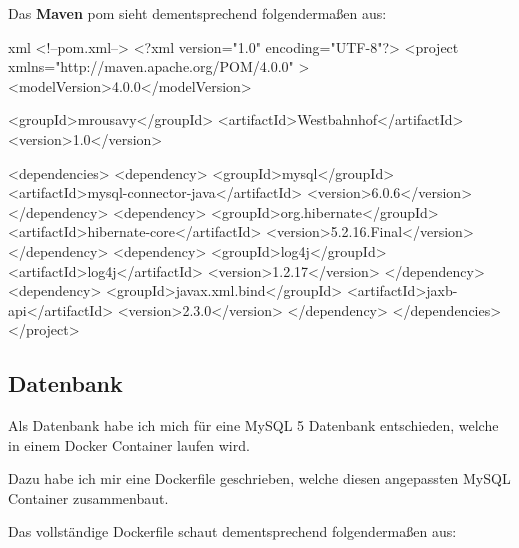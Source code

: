 Das \textbf{Maven} \gls{pom} sieht dementsprechend folgendermaßen aus:

\begin{code}{xml}
<!--pom.xml-->
<?xml version="1.0" encoding="UTF-8"?>
<project xmlns="http://maven.apache.org/POM/4.0.0" >
    <modelVersion>4.0.0</modelVersion>

    <groupId>mrousavy</groupId>
    <artifactId>Westbahnhof</artifactId>
    <version>1.0</version>

    <dependencies>
        <dependency>
            <groupId>mysql</groupId>
            <artifactId>mysql-connector-java</artifactId>
            <version>6.0.6</version>
        </dependency>
        <dependency>
            <groupId>org.hibernate</groupId>
            <artifactId>hibernate-core</artifactId>
            <version>5.2.16.Final</version>
        </dependency>
        <dependency>
            <groupId>log4j</groupId>
            <artifactId>log4j</artifactId>
            <version>1.2.17</version>
        </dependency>
        <dependency>
            <groupId>javax.xml.bind</groupId>
            <artifactId>jaxb-api</artifactId>
            <version>2.3.0</version>
        </dependency>
    </dependencies>
</project>
\end{code}

\clearpage
\subsection{Datenbank}

Als Datenbank habe ich mich für eine MySQL 5 Datenbank entschieden, welche in einem Docker \cite{wiki:docker} Container laufen wird.

Dazu habe ich mir eine Dockerfile \cite{docker:dockerfile} geschrieben, welche diesen angepassten MySQL Container zusammenbaut.

Das vollständige Dockerfile schaut dementsprechend folgendermaßen aus:


